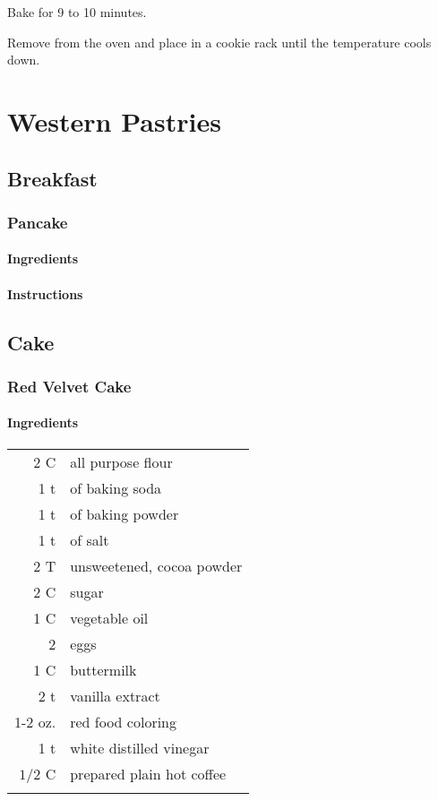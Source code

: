 \documentclass[12pt,landscape,twoside,twocolumn, openright, titlepage, draft]{book}
\begin{document}
\par
Bake for 9 to 10
minutes.  

\par
Remove from the oven and place in a cookie rack until the
temperature cools down.  

\chapter{Western Pastries}
\section{Breakfast}
\subsection{Pancake}
\subsubsection{Ingredients}

\subsubsection{Instructions}
\section{Cake}
\subsection{Red Velvet Cake}
\subsubsection{Ingredients}
\begin{tabular}{r p{1.5in}}
  2 C & all purpose flour \\
  1 t & of baking soda \\
  1 t & of baking powder \\
  1 t & of salt \\
  2 T & unsweetened, cocoa powder  \\
  2 C & sugar \\
  1 C & vegetable oil  \\
  2   & eggs \\
  1 C & buttermilk \\
  2 t & vanilla extract \\
  1-2 oz. & red food coloring \\
  1 t     & white distilled vinegar \\
  $1/2$ C & prepared plain hot coffee \\ \\
\end{tabular}
\end{document}
